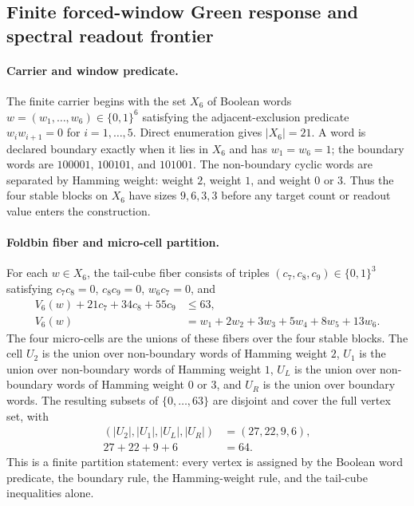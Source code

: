 \subsection{Finite forced-window Green response and spectral readout frontier}
\label{sec:window6-green-spectral-response-alpha-readout-frontier}

\paragraph{Carrier and window predicate.}
The finite carrier begins with the set $X_6$ of Boolean words $w=(w_1,\ldots,w_6)\in \{0,1\}^6$ satisfying the adjacent-exclusion predicate $w_iw_{i+1}=0$ for $i=1,\ldots,5$. Direct enumeration gives $|X_6|=21$. A word is declared boundary exactly when it lies in $X_6$ and has $w_1=w_6=1$; the boundary words are $100001$, $100101$, and $101001$. The non-boundary cyclic words are separated by Hamming weight: weight $2$, weight $1$, and weight $0$ or $3$. Thus the four stable blocks on $X_6$ have sizes $9,6,3,3$ before any target count or readout value enters the construction.

\paragraph{Foldbin fiber and micro-cell partition.}
For each $w\in X_6$, the tail-cube fiber consists of triples $(c_7,c_8,c_9)\in \{0,1\}^3$ satisfying $c_7c_8=0$, $c_8c_9=0$, $w_6c_7=0$, and
$$
\begin{aligned}
V_6(w)+21c_7+34c_8+55c_9 &\leq 63,\\
V_6(w) &= w_1+2w_2+3w_3+5w_4+8w_5+13w_6.
\end{aligned}
$$
The four micro-cells are the unions of these fibers over the four stable blocks. The cell $U_2$ is the union over non-boundary words of Hamming weight $2$, $U_1$ is the union over non-boundary words of Hamming weight $1$, $U_L$ is the union over non-boundary words of Hamming weight $0$ or $3$, and $U_R$ is the union over boundary words. The resulting subsets of $\{0,\ldots,63\}$ are disjoint and cover the full vertex set, with
$$
\begin{aligned}
(|U_2|,|U_1|,|U_L|,|U_R|)&=(27,22,9,6),\\
27+22+9+6&=64.
\end{aligned}
$$
This is a finite partition statement: every vertex is assigned by the Boolean word predicate, the boundary rule, the Hamming-weight rule, and the tail-cube inequalities alone.

